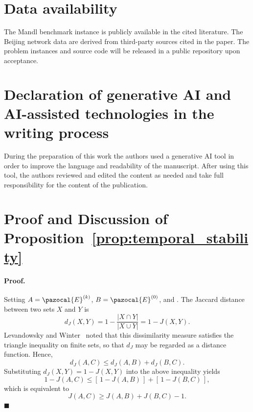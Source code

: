 \documentclass[a4paper,fleqn]{cas-sc}
\begin{document}
\section*{Data availability}
The Mandl benchmark instance is publicly available in the cited literature. The Beijing network data are derived from third-party sources cited in the paper. The problem instances and source code will be released in a public repository upon acceptance.

\section*{Declaration of generative AI and AI-assisted technologies in the writing process}
During the preparation of this work the authors used a generative AI tool in order to improve the language and readability of the manuscript. After using this tool, the authors reviewed and edited the content as needed and take full responsibility for the content of the publication.

%






\newpage
\appendix


\section{Proof and Discussion of Proposition~\ref{prop:temporal_stability}}
\label{app:temporal_stability_proof}

\paragraph{Proof.}
Setting $A=\pazocal{E}^{(k)}$, $B=\pazocal{E}^{(0)}$, and .
The Jaccard distance between two sets $X$ and $Y$ is
\[
d_J(X,Y)=1-\frac{|X\cap Y|}{|X\cup Y|}=1-J(X,Y).
\]
Levandowsky and Winter~\citep{levandowsky1971distance} noted that this
dissimilarity measure satisfies the triangle inequality on finite sets,
so that $d_J$ may be regarded as a distance function. Hence,
\[
d_J(A,C)\le d_J(A,B)+d_J(B,C).
\]
Substituting $d_J(X,Y)=1-J(X,Y)$ into the above inequality yields
\[
1-J(A,C)
\le [\,1-J(A,B)\,]+[\,1-J(B,C)\,],
\]
which is equivalent to
\[
J(A,C)\ge J(A,B)+J(B,C)-1.
\]
\hfill$\blacksquare$
\end{document}
